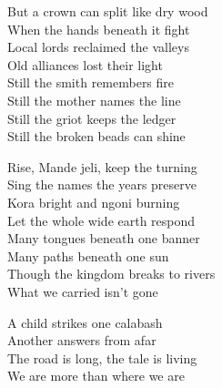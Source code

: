 \begin{lyrics}
But a crown can split like dry wood\\
When the hands beneath it fight\\
Local lords reclaimed the valleys\\
Old alliances lost their light\\
Still the smith remembers fire\\
Still the mother names the line\\
Still the griot keeps the ledger\\
Still the broken beads can shine

Rise, Mande jeli, keep the turning\\
Sing the names the years preserve\\
Kora bright and ngoni burning\\
Let the whole wide earth respond\\
Many tongues beneath one banner\\
Many paths beneath one sun\\
Though the kingdom breaks to rivers\\
What we carried isn’t gone

A child strikes one calabash\\
Another answers from afar\\
The road is long, the tale is living\\
We are more than where we are
\end{lyrics}

